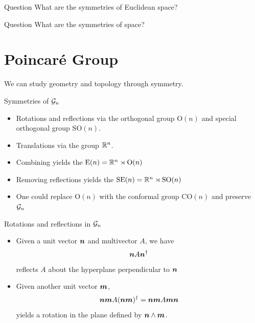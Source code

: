 \documentclass[aspectratio=169]{beamer}
\begin{document}
\begin{frame}{Question}
    \vfill
    \center
    \Large What are the symmetries of Euclidean space?
    \vfill
\end{frame}

\begin{frame}{Question}
    \vfill
    \center
    \Large What are the symmetries of  space?
    \vfill
\end{frame}


\section{Poincar\'e Group}

\begin{frame}{}
\vfill
\Large \centering We can study geometry and topology through symmetry.
\vfill
\end{frame}

\begin{frame}{Symmetries of $\mathcal{G}_n$}
\vfill
\begin{itemize}
	\item Rotations and reflections via the orthogonal group $\mathrm{O}(n)$ and special orthogonal group $\mathrm{SO}(n)$.
	\item Translations via the group $\mathbb{R}^n$.
	\item Combining yields the  $\mathrm{E}(n) = \mathbb{R}^n \rtimes \mathrm{O}(n)$
	\item Removing reflections yields the  $\mathrm{SE}(n)=\mathbb{R}^n \rtimes \mathrm{SO}(n)$
	\item One could replace $\mathrm{O}(n)$ with the conformal group $\mathrm{CO}(n)$ and preserve $\mathcal{G}_n$
\end{itemize}
\vfill
\end{frame}

\begin{frame}{Rotations and reflections in $\mathcal{G}_n$}
\vfill
\begin{itemize}
	\item Given a unit vector $\boldsymbol{n}$ and multivector $A$, we have 
	\[
	\boldsymbol{n} A \boldsymbol{n}^\dagger
	\]
	 reflects $A$ about the hyperplane perpendicular to $\boldsymbol{n}$
	\item Given another unit vector $\boldsymbol{m}$, 
	\[
	\boldsymbol{nm}A(\boldsymbol{nm})^\dagger = \boldsymbol{nm}A \boldsymbol{mn}
	\]
	 yields a rotation in the plane defined by $\boldsymbol{n}\wedge \boldsymbol{m}$.
\end{itemize}
\vfill
\end{frame}
\end{document}
